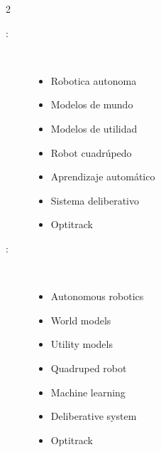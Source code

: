 \begin{multicols}{2}
\begin{description}
\item [\palabraschaveprincipal:] \mbox{} \\[-20pt]
  \begin{itemize}
    \item Robotica autonoma
    \item Modelos de mundo
    \item Modelos de utilidad
    \item Robot cuadrúpedo
    \item Aprendizaje automático
    \item Sistema deliberativo
    \item Optitrack
  \end{itemize}
\end{description}
\begin{description}
\item [\palabraschavesecundaria:] \mbox{} \\[-20pt]
  \begin{itemize}
    \item Autonomous robotics
    \item World models
    \item Utility models
    \item Quadruped robot
    \item Machine learning
    \item Deliberative system
    \item Optitrack
  \end{itemize}
\end{description}
\end{multicols}
